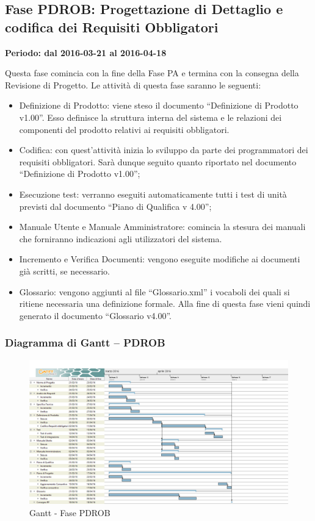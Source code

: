 \documentclass[../PianoProgetto.tex]{subfiles}
\begin{document}
	\subsection{Fase PDROB: Progettazione di Dettaglio e codifica dei Requisiti Obbligatori}
		\textbf{Periodo: dal 2016-03-21 al 2016-04-18}
		
		Questa fase comincia con la fine della Fase PA e termina con la consegna della Revisione di Progetto. Le attività di questa fase saranno le seguenti:
		\begin{itemize}
			\item Definizione di Prodotto: viene steso il documento “Definizione di Prodotto v1.00”. Esso definisce la struttura interna del sistema e le relazioni dei componenti del prodotto relativi ai requisiti obbligatori.

			\item Codifica: con quest’attività inizia lo sviluppo da parte dei programmatori dei requisiti obbligatori. Sarà dunque seguito quanto riportato nel documento “Definizione di Prodotto v1.00”;

			\item Esecuzione test: verranno eseguiti automaticamente tutti i test di unità previsti dal documento “Piano di Qualifica v 4.00”;

			\item Manuale Utente e Manuale Amministratore: comincia la stesura dei manuali che forniranno indicazioni agli utilizzatori del sistema.

			\item Incremento e Verifica Documenti: vengono eseguite modifiche ai documenti già scritti, se necessario.

			\item Glossario: vengono aggiunti al file “Glossario.xml” i vocaboli dei quali si ritiene necessaria una definizione formale. Alla fine di questa fase vieni quindi generato il documento “Glossario v4.00”.
		\end{itemize}
		
		\subsubsection{Diagramma di Gantt – PDROB}
			\begin{figure}[!h]
				\centering
				\includegraphics[width=\textwidth]{gantt_png/4-requisiti_obbligatori}
				\caption{Gantt - Fase PDROB}
				\label{fig:Gantt - Fase PDROB}
			\end{figure}
			
\end{document}
